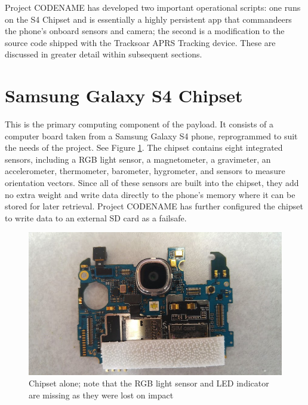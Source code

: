 \documentclass[english]{report}
\begin{document}
\newpage

Project CODENAME has developed two important operational scripts: one runs on the S4 Chipset and is essentially a highly persistent app that commandeers the phone's onboard sensors and camera; the second is a modification to the source code shipped with the Tracksoar APRS Tracking device.  These are discussed in greater detail within subsequent sections.


\section{Samsung Galaxy S4 Chipset}

This is the primary computing component of the payload. It consists of a computer board taken from a Samsung Galaxy S4 phone, reprogrammed to suit the needs of the project. See Figure \ref{fig:chipset-alone}.  The chipset contains eight integrated sensors, including a RGB light sensor, a magnetometer, a gravimeter, an accelerometer, thermometer, barometer, hygrometer, and sensors to measure orientation vectors. Since all of these sensors are built into the chipset, they add no extra weight and write data directly to the phone's memory where it can be stored for later retrieval. Project CODENAME has further configured the chipset to write data to an external SD card as a failsafe.

\begin{figure}[H]
\begin{centering}
\includegraphics[scale=0.3]{./images/chipset-alone}
\par\end{centering}
\label{fig:chipset-alone}
\caption{Chipset alone; note that the RGB light sensor and LED indicator are missing as they were lost on impact}
\end{figure}
\end{document}
